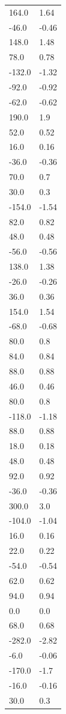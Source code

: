 \begin{longtable}{ll}
164.0 & 1.64 \\
-46.0 & -0.46 \\
148.0 & 1.48 \\
78.0 & 0.78 \\
-132.0 & -1.32 \\
-92.0 & -0.92 \\
-62.0 & -0.62 \\
190.0 & 1.9 \\
52.0 & 0.52 \\
16.0 & 0.16 \\
-36.0 & -0.36 \\
70.0 & 0.7 \\
30.0 & 0.3 \\
-154.0 & -1.54 \\
82.0 & 0.82 \\
48.0 & 0.48 \\
-56.0 & -0.56 \\
138.0 & 1.38 \\
-26.0 & -0.26 \\
36.0 & 0.36 \\
154.0 & 1.54 \\
-68.0 & -0.68 \\
80.0 & 0.8 \\
84.0 & 0.84 \\
88.0 & 0.88 \\
46.0 & 0.46 \\
80.0 & 0.8 \\
-118.0 & -1.18 \\
88.0 & 0.88 \\
18.0 & 0.18 \\
48.0 & 0.48 \\
92.0 & 0.92 \\
-36.0 & -0.36 \\
300.0 & 3.0 \\
-104.0 & -1.04 \\
16.0 & 0.16 \\
22.0 & 0.22 \\
-54.0 & -0.54 \\
62.0 & 0.62 \\
94.0 & 0.94 \\
0.0 & 0.0 \\
68.0 & 0.68 \\
-282.0 & -2.82 \\
-6.0 & -0.06 \\
-170.0 & -1.7 \\
-16.0 & -0.16 \\
30.0 & 0.3 \\

\end{longtable}
